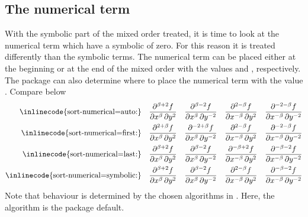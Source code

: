 \subsection{The numerical term} \label{ssec:sort-numerical}
With the symbolic part of the mixed order treated, it is time to look at the numerical term which have a symbolic of zero. For this reason it is treated differently than the symbolic terms. The numerical term can be placed either at the beginning or at the end of the mixed order with the values  and , respectively. The package can also determine where to place the numerical term with the value . Compare below
\begin{align*}
	\text{\inlinecode{sort-numerical=auto:}}  && 
	\pdv[order={\beta, 2}, sort-numerical=auto]{f}{x,y}   &&
	\pdv[order={\beta, -2}, sort-numerical=auto]{f}{x,y}  &&
	\pdv[order={-\beta, 2}, sort-numerical=auto]{f}{x,y}  &&
	\pdv[order={-\beta, -2}, sort-numerical=auto]{f}{x,y} \\
	\text{\inlinecode{sort-numerical=first:}} &&
	\pdv[order={\beta, 2}, sort-numerical=first]{f}{x,y}   &&   \pdv[order={\beta, -2}, sort-numerical=first]{f}{x,y}  &&   \pdv[order={-\beta, 2}, sort-numerical=first]{f}{x,y}  &&   \pdv[order={-\beta, -2}, sort-numerical=first]{f}{x,y} \\
	\text{\inlinecode{sort-numerical=last:}}  &&
	\pdv[order={\beta, 2}, sort-numerical=last]{f}{x,y}   &&   \pdv[order={\beta, -2}, sort-numerical=last]{f}{x,y}  &&   \pdv[order={-\beta, 2}, sort-numerical=last]{f}{x,y}  &&   \pdv[order={-\beta, -2}, sort-numerical=last]{f}{x,y} \\
	\text{\inlinecode{sort-numerical=symbolic:}}  && 
	\pdv[order={\beta, 2}, sort-numerical=symbolic]{f}{x,y}   &&   \pdv[order={\beta, -2}, sort-numerical=symbolic]{f}{x,y}  &&   \pdv[order={-\beta, 2}, sort-numerical=symbolic]{f}{x,y}  &&   \pdv[order={-\beta, -2}, sort-numerical=symbolic]{f}{x,y}
\end{align*}
Note that  behaviour is determined by the chosen algorithms in . Here, the algorithm is the package default.


